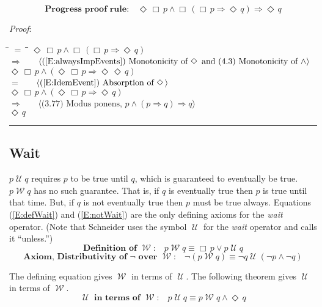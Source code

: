 \documentclass[12pt, fleqn, leqno]{article}
\newcommand{\lgap}{2pt}                             %
\newcommand{\mymathindent}{24pt}                    %
\newcommand{\impl}{\ensuremath{\Rightarrow}}        %
\newcommand{\Until}{\;\mathcal{U}\;}
\newcommand{\Wait}{\;\mathcal{W}\;}
\newcommand{\Event}{\Diamond\,}
\newcommand{\Always}{\Box\,}
\newcommand{\myqed}{\rule[-.23ex]{1.2ex}{2.0ex}}
\newcommand{\myqedtab}{\hspace{384pt}}              %
\newcommand{\Gll} {\langle}                         %
\newcommand{\Ggg} {\rangle}                         %
\newcommand{\Hint}[1]     {\ \ \ $\Gll              \mbox{#1} \Ggg$ }   %
\begin{document}
\begin{equation}\label{E:PrProofRule}
\textbf{Progress proof rule:}\quad \Event\Always p \land \Always(\Always p \impl \Event q) \impl \Event q
\end{equation}

\emph{Proof}:
\begin{tabbing}
\hspace{\mymathindent} \= $= \;$ \= \myqedtab \= \kill
\> \>   $\Event\Always p \land \Always(\Always p \impl \Event q)$\\[\lgap]
\> $\impl$  \>  \Hint{(\ref{E:alwaysImpEvents}) Monotonicity of $\Event$ and (4.3) Monotonicity of $\land$}\\[\lgap]
\> \>   $\Event\Always p \land (\Event\Always p \impl \Event\Event q)$\\[\lgap]
\> $=$  \>  \Hint{(\ref{E:IdemEvent}) Absorption of $\Event$}\\[\lgap]
\> \>   $\Event\Always p \land (\Event\Always p \impl \Event q)$\\[\lgap]
\> $\impl$  \>  \Hint{(3.77) Modus ponens, $p\land (p\impl q)\impl q$}\\[\lgap]
\> \>   $\Event q$ \quad \myqed
\end{tabbing}

\subsection{Wait}\label{section-wait}

$p\Until q$ requires $p$ to be true until $q$, which is guaranteed to eventually be true.
$p\Wait q$ has no such guarantee.
That is, if $q$ is eventually true then $p$ is true until that time.
But, if $q$ is not eventually true then $p$ must be true always.
Equations (\ref{E:defWait}) and (\ref{E:notWait}) are the only defining axioms for the \textit{wait} operator.
(Note that Schneider \cite{Schn} uses the symbol $\Until$ for the \textit{wait} operator and calls it ``unless.'')
\begin{equation}\label{E:defWait}
\textbf{Definition of $\Wait$:}\quad p \Wait q \equiv \Always p \lor p \Until q 
\end{equation}
\begin{equation}\label{E:notWait}
\textbf{Axiom, Distributivity of $\neg$ over $\Wait$:}\quad \neg (p \Wait q) \equiv \neg q \Until (\neg p \land \neg q)
\end{equation}

The defining equation gives $\Wait$ in terms of $\Until$. The following theorem gives $\Until$ in terms of $\Wait$.
\begin{equation}\label{E:untilFromWait}
\textbf{$\Until$ in terms of $\Wait$:}\quad p \Until q \equiv p \Wait q\land \Event q
\end{equation}
\end{document}
